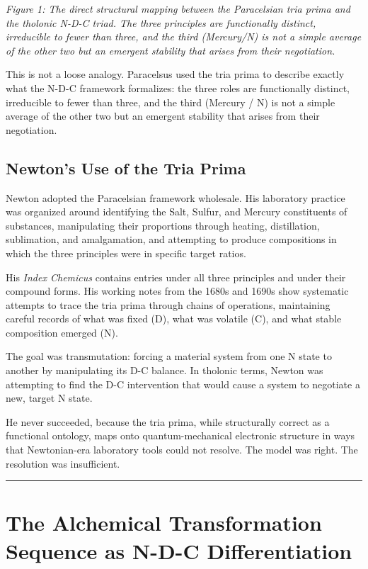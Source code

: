 \documentclass[12pt]{article}
\begin{document}
\emph{Figure 1: The direct structural mapping between the Paracelsian
tria prima and the tholonic N-D-C triad. The three principles are
functionally distinct, irreducible to fewer than three, and the third
(Mercury/N) is not a simple average of the other two but an emergent
stability that arises from their negotiation.}

This is not a loose analogy. Paracelsus used the tria prima to describe
exactly what the N-D-C framework formalizes: the three roles are
functionally distinct, irreducible to fewer than three, and the third
(Mercury / N) is not a simple average of the other two but an emergent
stability that arises from their negotiation.

\subsection{Newton's Use of the Tria Prima}\label{newtons-use-of-the-tria-prima}

Newton adopted the Paracelsian framework wholesale. His laboratory
practice was organized around identifying the Salt, Sulfur, and Mercury
constituents of substances, manipulating their proportions through
heating, distillation, sublimation, and amalgamation, and attempting to
produce compositions in which the three principles were in specific
target ratios.

His \emph{Index Chemicus} contains entries under all three principles
and under their compound forms. His working notes from the 1680s and
1690s show systematic attempts to trace the tria prima through chains of
operations, maintaining careful records of what was fixed (D), what was
volatile (C), and what stable composition emerged (N).

The goal was transmutation: forcing a material system from one N state
to another by manipulating its D-C balance. In tholonic terms, Newton
was attempting to find the D-C intervention that would cause a system to
negotiate a new, target N state.

He never succeeded, because the tria prima, while structurally correct
as a functional ontology, maps onto quantum-mechanical electronic
structure in ways that Newtonian-era laboratory tools could not resolve.
The model was right. The resolution was insufficient.

\begin{center}\rule{0.5\linewidth}{0.5pt}\end{center}

\section{The Alchemical Transformation Sequence as N-D-C Differentiation}\label{the-alchemical-transformation-sequence-as-n-d-c-differentiation}
\end{document}
